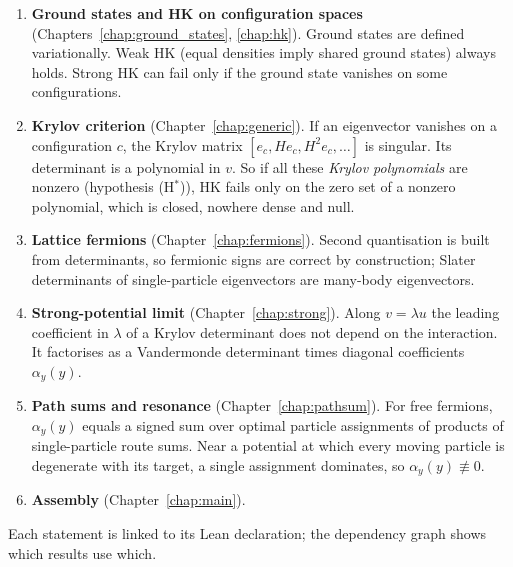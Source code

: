 \begin{enumerate}
  \item \textbf{Ground states and HK on configuration spaces} (Chapters~\ref{chap:ground_states},
  \ref{chap:hk}). Ground states are defined variationally. Weak HK (equal densities imply shared ground
  states) always holds. Strong HK can fail only if the ground state vanishes on some configurations.
  \item \textbf{Krylov criterion} (Chapter~\ref{chap:generic}). If an eigenvector vanishes on a
  configuration $c$, the Krylov matrix $[e_c, He_c, H^2e_c,\dots]$ is singular. Its determinant is a
  polynomial in $v$. So if all these \emph{Krylov polynomials} are nonzero (hypothesis (H$^*$)), HK fails
  only on the zero set of a nonzero polynomial, which is closed, nowhere dense and null.
  \item \textbf{Lattice fermions} (Chapter~\ref{chap:fermions}). Second quantisation is built from
  determinants, so fermionic signs are correct by construction; Slater determinants of single-particle
  eigenvectors are many-body eigenvectors.
  \item \textbf{Strong-potential limit} (Chapter~\ref{chap:strong}). Along $v=\lambda u$ the leading
  coefficient in $\lambda$ of a Krylov determinant does not depend on the interaction. It factorises as a
  Vandermonde determinant times diagonal coefficients $\alpha_y(y)$.
  \item \textbf{Path sums and resonance} (Chapter~\ref{chap:pathsum}). For free fermions,
  $\alpha_y(y)$ equals a signed sum over optimal particle assignments of products of single-particle route
  sums. Near a potential at which every moving particle is degenerate with its target, a single assignment
  dominates, so $\alpha_y(y)\not\equiv 0$.
  \item \textbf{Assembly} (Chapter~\ref{chap:main}).
\end{enumerate}

Each statement is linked to its Lean declaration; the dependency graph shows which results use which.
